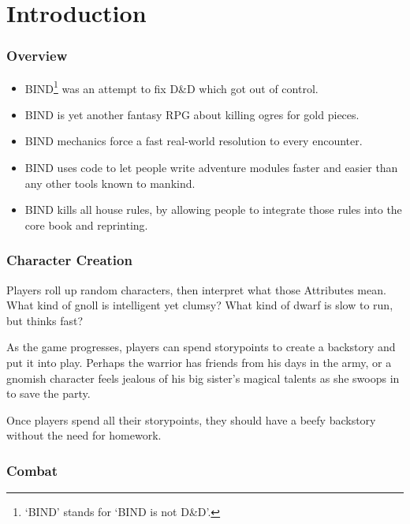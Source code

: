 \chapter*{Introduction}

\begin{multicols}{2}

\subsection*{Overview}

\begin{itemize}

  \item
  BIND\footnote{`BIND' stands for `BIND is not D\&D'.} was an attempt to fix D\&D which got out of control.
  \item
  BIND is yet another fantasy RPG about killing ogres for gold pieces.
  \item
  BIND mechanics force a fast real-world resolution to every encounter.
  \item
  BIND uses code to let people write adventure modules faster and easier than any other tools known to mankind.
  \item
  BIND kills all house rules, by allowing people to integrate those rules into the core book and reprinting.

\end{itemize}

\subsection*{Character Creation}

Players roll up random characters, then interpret what those Attributes mean.
What kind of gnoll is intelligent yet clumsy?
What kind of dwarf is slow to run, but thinks fast?

As the game progresses, players can spend \glspl{storypoint} to create a backstory and put it into play.
Perhaps the warrior has friends from his days in the army, or a gnomish character feels jealous of his big sister's magical talents as she swoops in to save the party.

Once players spend all their \glspl{storypoint}, they should have a beefy backstory without the need for homework.

\subsection*{Combat}


\end{multicols}

